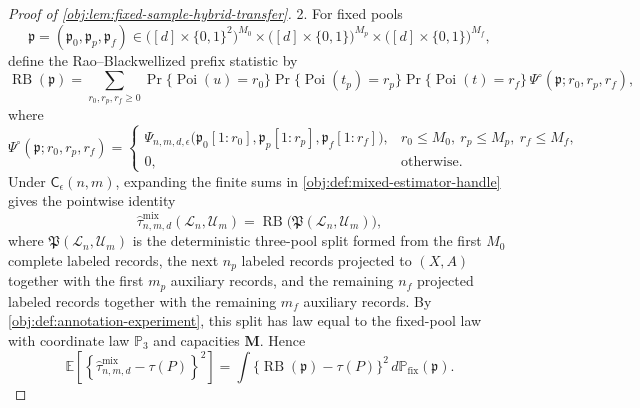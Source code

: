 \begin{proof}[Proof of \cref{obj:lem:fixed-sample-hybrid-transfer}]
2. For fixed pools
\[
\mathfrak p=(\mathfrak p_0,\mathfrak p_p,\mathfrak p_f)
\in
\bigl([d]\times\{0,1\}^2\bigr)^{M_0}
\times
\bigl([d]\times\{0,1\}\bigr)^{M_p}
\times
\bigl([d]\times\{0,1\}\bigr)^{M_f},
\]
define the Rao--Blackwellized prefix statistic by
\[
\operatorname{RB}(\mathfrak p)
=
\sum_{r_0,r_p,r_f\ge0}
\Pr\{\operatorname{Poi}(u)=r_0\}
\Pr\{\operatorname{Poi}(t_p)=r_p\}
\Pr\{\operatorname{Poi}(t)=r_f\}
\,\Psi^\circ(\mathfrak p;r_0,r_p,r_f),
\]
where
\[
\Psi^\circ(\mathfrak p;r_0,r_p,r_f)
=
\begin{cases}
\Psi_{n,m,d,\epsilon}
\bigl(\mathfrak p_0[1{:}r_0],
      \mathfrak p_p[1{:}r_p],
      \mathfrak p_f[1{:}r_f]\bigr),
& r_0\le M_0,\ r_p\le M_p,\ r_f\le M_f,\\
0,&\text{otherwise.}
\end{cases}
\]
Under \(\mathsf C_\epsilon(n,m)\), expanding the finite sums in \cref{obj:def:mixed-estimator-handle} gives the pointwise identity
\[
\widehat\tau^{\mathrm{mix}}_{n,m,d}(\mathcal L_n,\mathcal U_m)
=
\operatorname{RB}\bigl(\mathfrak P(\mathcal L_n,\mathcal U_m)\bigr),
\]
where \(\mathfrak P(\mathcal L_n,\mathcal U_m)\) is the deterministic three-pool split formed from the first \(M_0\) complete labeled records, the next \(n_p\) labeled records projected to \((X,A)\) together with the first \(m_p\) auxiliary records, and the remaining \(n_f\) projected labeled records together with the remaining \(m_f\) auxiliary records.  By \cref{obj:def:annotation-experiment}, this split has law equal to the fixed-pool law with coordinate law \(\mathbb P_3\) and capacities \(\boldsymbol M\).  Hence
\[
\mathbb E\!\left[
\left\{\widehat\tau^{\mathrm{mix}}_{n,m,d}-\tau(P)\right\}^2
\right]
=
\int
\bigl\{\operatorname{RB}(\mathfrak p)-\tau(P)\bigr\}^2
\,d\mathbb P_{\mathrm{fix}}(\mathfrak p).
\]


\end{proof}
